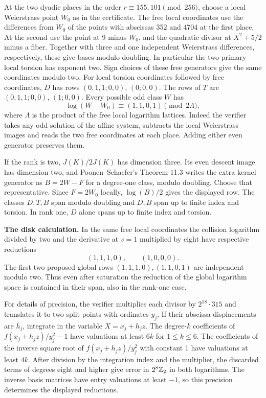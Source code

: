 At the two dyadic places in the order \(r\equiv155,101\pmod{256}\),
choose a local Weierstrass point \(W_0\) as in the certificate. The
free local coordinates use the differences from \(W_0\) of the points
with abscissas 352 and 4704 at the first place. At the second use
the point at 9 minus \(W_0\), and the quadratic divisor at
\(X^2+5/2\) minus a fiber. Together with three and one independent
Weierstrass differences, respectively, these give bases modulo
doubling. In particular the two-primary local torsion has exponent
two. Sign choices of these free generators give the same coordinates
modulo two. For local torsion coordinates followed by free coordinates,
\(D\) has rows \((0,1,1;0,0)\), \((0;0,0)\).
The rows of \(T\) are \((0,1,1;0,0)\), \((1;0,0)\).
Every possible odd class \(W\) has
\[\log(W-W_0)\equiv(1,1,0,1)\pmod {2\Lambda},\]
where \(\Lambda\) is the product of the free local logarithm lattices.
Indeed the verifier takes any odd solution of the affine system,
subtracts the local Weierstrass images and reads the two free
coordinates at each place. Adding either even generator preserves them.

If the rank is two, \(J(K)/2J(K)\) has dimension three. Its even
descent image has dimension two, and Poonen--Schaefer's Theorem 11.3
writes the extra kernel generator as \(B=2W-F\) for a degree-one
class, modulo doubling. Choose that representative. Since \(F=2W_0\)
locally, \(\log(B)/2\) gives the displayed row. The classes
\(D,T,B\) span modulo doubling and \(D,B\) span up to finite index
and torsion. In rank one, \(D\) alone spans up to finite index and
torsion.

\textbf{The disk calculation.} In the same free local coordinates the
collision logarithm divided by two and the derivative at \(v=1\)
multiplied by eight have respective reductions
\[(1,1,1,0),\qquad (1,0,0,0).\]
The first two proposed global rows \((1,1,1,0),(1,1,0,1)\) are
independent modulo two. Thus even after saturation the reduction of
the global logarithm space is contained in their span, also in the
rank-one case.

For details of precision, the verifier multiplies each divisor by
\(2^{18}\cdot315\) and translates it to two split points with ordinates
\(y_j\). If their abscissa displacements are \(h_j\), integrate in
the variable \(X=x_j+h_j z\). The degree-\(k\) coefficients of
\(f(x_j+h_j z)/y_j^2-1\) have valuations at least \(6k\) for
\(1\le k\le6\). The coefficients of the inverse square root of \(f(x_j+h_j z)/y_j^2\)
with constant 1 have valuations at least \(4k\). After division by
the integration index and the multiplier, the discarded terms of
degrees eight and higher give error in \(2^8\mathbb Z_2\) in both
logarithms. The inverse basis matrices have entry valuations at
least \(-1\), so this precision determines the displayed reductions.

